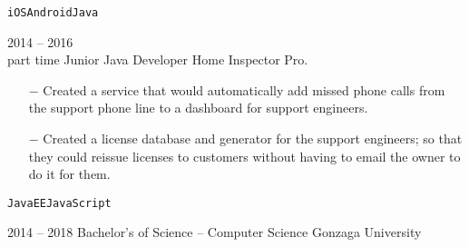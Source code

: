 \documentclass[9pt]{developercv} %
\begin{document}
\begin{entrylist}
{\begin{itemize}
			\end{itemize}
			\texttt{iOS}\slashsep\texttt{Android}\slashsep\texttt{Java}}
	\entry
		{2014 -- 2016\\\footnotesize{part time}}
		{Junior Java Developer}
		{Home Inspector Pro.}
		{
			\vspace*{-\baselineskip}
			\begin{itemize}
				\item[$-$] Created a service that would automatically add missed phone calls from the support phone line to a dashboard for support engineers.
				\item[$-$] Created a license database and generator for the support engineers; so that they could reissue licenses to customers without having to email the owner to do it for them.
			\end{itemize}
			\texttt{JavaEE}\slashsep\texttt{JavaScript}}
\end{entrylist}

\newpage
{}

\begin{entrylist}
	\entry
		{2014 -- 2018}
		{Bachelor's of Science \textnormal{-- Computer Science}}
		{Gonzaga University}
		{}
\end{entrylist}



\end{document}
